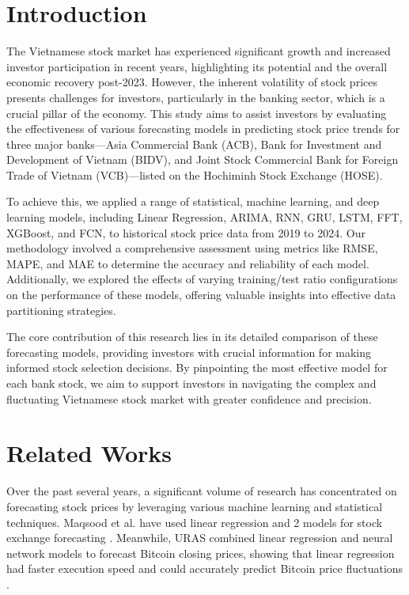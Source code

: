 \documentclass{ieeeojies}
\begin{document}
\section{Introduction}%
The Vietnamese stock market has experienced significant growth and increased investor participation in recent years, highlighting its potential and the overall economic recovery post-2023. However, the inherent volatility of stock prices presents challenges for investors, particularly in the banking sector, which is a crucial pillar of the economy. This study aims to assist investors by evaluating the effectiveness of various forecasting models in predicting stock price trends for three major banks—Asia Commercial Bank (ACB), Bank for Investment and Development of Vietnam (BIDV), and Joint Stock Commercial Bank for Foreign Trade of Vietnam (VCB)—listed on the Hochiminh Stock Exchange (HOSE).

To achieve this, we applied a range of statistical, machine learning, and deep learning models, including Linear Regression, ARIMA, RNN, GRU, LSTM, FFT, XGBoost, and FCN, to historical stock price data from 2019 to 2024. Our methodology involved a comprehensive assessment using metrics like RMSE, MAPE, and MAE to determine the accuracy and reliability of each model. Additionally, we explored the effects of varying training/test ratio configurations on the performance of these models, offering valuable insights into effective data partitioning strategies.

The core contribution of this research lies in its detailed comparison of these forecasting models, providing investors with crucial information for making informed stock selection decisions. By pinpointing the most effective model for each bank stock, we aim to support investors in navigating the complex and fluctuating Vietnamese stock market with greater confidence and precision.
\section{Related Works}
Over the past several years, a significant volume of research has concentrated on forecasting stock prices by leveraging various machine learning and statistical techniques. Maqsood et al. have used linear regression and 2 models for stock exchange forecasting \cite{cakra2015stock}. Meanwhile, URAS combined linear regression and neural network models to forecast Bitcoin closing prices, showing that linear regression had faster execution speed and could accurately predict Bitcoin price fluctuations \cite{uras2020forecasting}.
\end{document}
